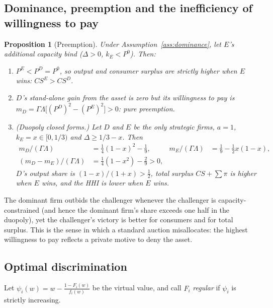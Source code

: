 \documentclass[12pt,a4paper]{article}
\newtheorem{proposition}{Proposition}
\theoremstyle{definition}
\theoremstyle{remark}
\begin{document}
\subsection{Dominance, preemption and the inefficiency of willingness to pay}

\begin{proposition}[Preemption]\label{prop:preemption}
Under Assumption~\ref{ass:dominance}, let $E$'s additional capacity bind ($\Delta>0$, $k_E<P^0$). Then:
\begin{enumerate}
\item[(a)] $P^E<P^D=P^0$, so output and consumer surplus are strictly higher when $E$ wins: $CS^E>CS^D$.
\item[(b)] $D$'s stand-alone gain from the asset is zero but its willingness to pay is $m_D=\Gamma\Lambda\big[(P^D)^2-(P^E)^2\big]>0$: pure preemption.
\item[(c)] (Duopoly closed forms.) Let $D$ and $E$ be the only strategic firms, $a=1$, $k_E=x\in[0,1/3)$ and $\Delta\ge 1/3-x$. Then
\begin{align*}
m_D/(\Gamma\Lambda)&=\tfrac14(1-x)^2-\tfrac19, & m_E/(\Gamma\Lambda)&=\tfrac19-\tfrac12x(1-x),\\
(m_D-m_E)/(\Gamma\Lambda)&=\tfrac14(1-x^2)-\tfrac29>0,
\end{align*}
$D$'s output share is $(1-x)/(1+x)>\tfrac12$, total surplus $CS+\sum\pi$ is higher when $E$ wins, and the HHI is lower when $E$ wins.
\end{enumerate}
\end{proposition}

The dominant firm outbids the challenger whenever the challenger is capacity-constrained (and hence the dominant firm's share exceeds one half in the duopoly), yet the challenger's victory is better for consumers and for total surplus. This is the sense in which a standard auction misallocates: the highest willingness to pay reflects a private motive to deny the asset.

\subsection{Optimal discrimination}

Let $\psi_i(w)=w-\frac{1-F_i(w)}{f_i(w)}$ be the virtual value, and call $F_i$ \emph{regular} if $\psi_i$ is strictly increasing.
\end{document}
